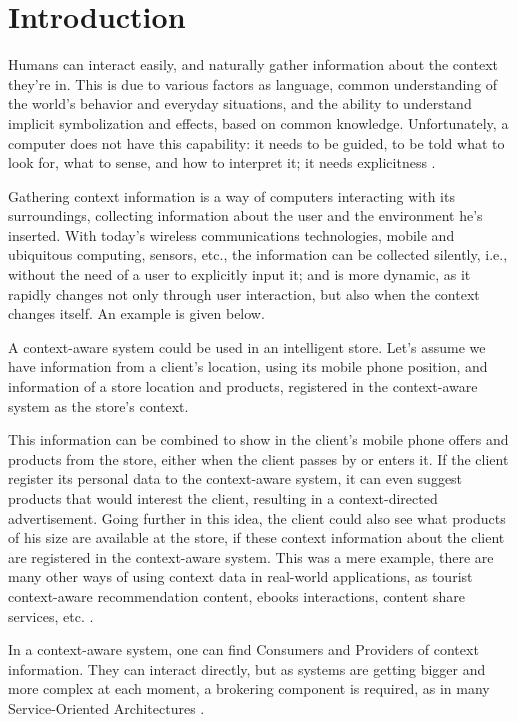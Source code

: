\chapter{Introduction}

Humans can interact easily, and naturally gather information about the context they're in. This is due to various factors as language, common understanding of the world's behavior and everyday situations, and the ability to understand implicit symbolization and effects, based on common knowledge. Unfortunately, a computer does not have this capability: it needs to be guided, to be told what to look for, what to sense, and how to interpret it; it needs explicitness \cite{dey2000providing}.


Gathering context information is a way of computers interacting with its surroundings, collecting information about the user and the environment he's inserted. With today's wireless communications technologies, mobile and ubiquitous computing, sensors, etc., the information can be collected silently, i.e., without the need of a user to explicitly input it; and is more dynamic, as it rapidly changes not only through user interaction, but also when the context changes itself. An example is given below.

A context-aware system could be used in an intelligent store. Let's assume we have information from a client's location, using its mobile phone position, and information of a store location and products, registered in the context-aware system as the store's context. 

This information can be combined to show in the client's mobile phone offers and products from the store, either when the client passes by or enters it. If the client register its personal data to the context-aware system, it can even suggest products that would interest the client, resulting in a context-directed advertisement. Going further in this idea, the client could also see what products of his size are available at the store, if these context information about the client are registered in the context-aware system. This was a mere example, there are many other ways of using context data in real-world applications, as tourist context-aware recommendation content, ebooks interactions, content share services, etc. \cite{moltchanov2011context}.

In a context-aware system, one can find Consumers and Providers of context information. They can interact directly, but as systems are getting bigger and more complex at each moment, a brokering component is required, as in many Service-Oriented Architectures \cite{arsanjani2004service}.

